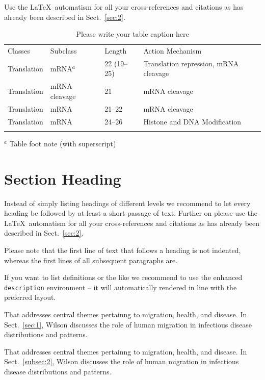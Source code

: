 \documentclass[graybox]{svmult}
\begin{document}
 Use the \LaTeX\ automatism for all your cross-refer\-ences and citations as has already been described in Sect.~\ref{sec:2}.
%
%
\begin{table}[!t]
\caption{Please write your table caption here}
\label{tab:1}       %
%
%
\begin{tabular}{p{2cm}p{2.4cm}p{2cm}p{4.9cm}}
\hline\noalign{\smallskip}
Classes & Subclass & Length & Action Mechanism  \\
\noalign{\smallskip}\svhline\noalign{\smallskip}
Translation & mRNA$^a$  & 22 (19--25) & Translation repression, mRNA cleavage\\
Translation & mRNA cleavage & 21 & mRNA cleavage\\
Translation & mRNA  & 21--22 & mRNA cleavage\\
Translation & mRNA  & 24--26 & Histone and DNA Modification\\
\noalign{\smallskip}\hline\noalign{\smallskip}
\end{tabular}
$^a$ Table foot note (with superscript)
\end{table}
%
\section{Section Heading}
\label{sec:3}
Instead of simply listing headings of different levels we recommend to let every heading be followed by at least a short passage of text.  Further on please use the \LaTeX\ automatism for all your cross-references and citations as has already been described in Sect.~\ref{sec:2}.

Please note that the first line of text that follows a heading is not indented, whereas the first lines of all subsequent paragraphs are.

If you want to list definitions or the like we recommend to use the enhanced \verb|description| environment -- it will automatically rendered in line with the preferred layout.

\begin{description}[Type 1]
\item[Type 1]{That addresses central themes pertainng to migration, health, and disease. In Sect.~\ref{sec:1}, Wilson discusses the role of human migration in infectious disease distributions and patterns.}
\item[Type 2]{That addresses central themes pertainng to migration, health, and disease. In Sect.~\ref{subsec:2}, Wilson discusses the role of human migration in infectious disease distributions and patterns.}
\end{description}
\end{document}
